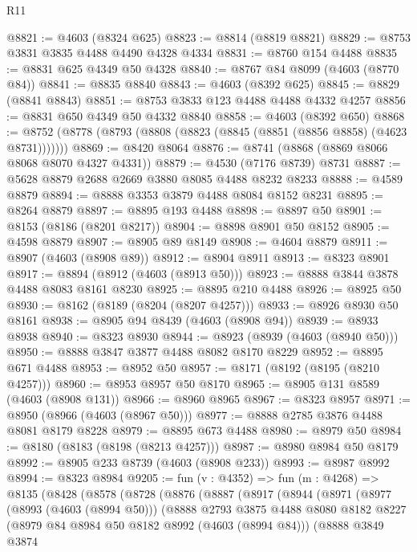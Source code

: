 \begin{lexlean}{R11}
\begin{coremodule}
@8821 := @4603 (@8324 @625)
@8823 := @8814 (@8819 @8821)
@8829 := @8753 @3831 @3835 @4488 @4490 @4328 @4334
@8831 := @8760 @154 @4488
@8835 := @8831 @625 @4349 @50 @4328
@8840 := @8767 @84 @8099 (@4603 (@8770 @84))
@8841 := @8835 @8840
@8843 := @4603 (@8392 @625)
@8845 := @8829 (@8841 @8843)
@8851 := @8753 @3833 @123 @4488 @4488 @4332 @4257
@8856 := @8831 @650 @4349 @50 @4332 @8840
@8858 := @4603 (@8392 @650)
@8868 := @8752 (@8778 (@8793 (@8808 (@8823 (@8845 (@8851 (@8856 @8858) (@4623 @8731)))))))
@8869 := @8420 @8064
@8876 := @8741 (@8868 (@8869 @8066 @8068 @8070 @4327 @4331))
@8879 := @4530 (@7176 @8739) @8731
@8887 := @5628 @8879 @2688 @2669 @3880 @8085 @4488 @8232 @8233
@8888 := @4589 @8879
@8894 := @8888 @3353 @3879 @4488 @8084 @8152 @8231
@8895 := @8264 @8879
@8897 := @8895 @193 @4488
@8898 := @8897 @50
@8901 := @8153 (@8186 (@8201 @8217))
@8904 := @8898 @8901 @50 @8152
@8905 := @4598 @8879
@8907 := @8905 @89 @8149
@8908 := @4604 @8879
@8911 := @8907 (@4603 (@8908 @89))
@8912 := @8904 @8911
@8913 := @8323 @8901
@8917 := @8894 (@8912 (@4603 (@8913 @50)))
@8923 := @8888 @3844 @3878 @4488 @8083 @8161 @8230
@8925 := @8895 @210 @4488
@8926 := @8925 @50
@8930 := @8162 (@8189 (@8204 (@8207 @4257)))
@8933 := @8926 @8930 @50 @8161
@8938 := @8905 @94 @8439 (@4603 (@8908 @94))
@8939 := @8933 @8938
@8940 := @8323 @8930
@8944 := @8923 (@8939 (@4603 (@8940 @50)))
@8950 := @8888 @3847 @3877 @4488 @8082 @8170 @8229
@8952 := @8895 @671 @4488
@8953 := @8952 @50
@8957 := @8171 (@8192 (@8195 (@8210 @4257)))
@8960 := @8953 @8957 @50 @8170
@8965 := @8905 @131 @8589 (@4603 (@8908 @131))
@8966 := @8960 @8965
@8967 := @8323 @8957
@8971 := @8950 (@8966 (@4603 (@8967 @50)))
@8977 := @8888 @2785 @3876 @4488 @8081 @8179 @8228
@8979 := @8895 @673 @4488
@8980 := @8979 @50
@8984 := @8180 (@8183 (@8198 (@8213 @4257)))
@8987 := @8980 @8984 @50 @8179
@8992 := @8905 @233 @8739 (@4603 (@8908 @233))
@8993 := @8987 @8992
@8994 := @8323 @8984
@9205 := fun (v : @4352) =>
  fun (m : @4268) =>
  @8135
    (@8428
      (@8578
        (@8728
          (@8876
            (@8887
              (@8917
                (@8944
                  (@8971
                    (@8977
                      (@8993 (@4603 (@8994 @50)))
                      (@8888
                        @2793
                        @3875
                        @4488
                        @8080
                        @8182
                        @8227
                        (@8979 @84 @8984 @50 @8182 @8992 (@4603 (@8994 @84)))
                        (@8888
                          @3849
                          @3874

\end{coremodule}
\end{lexlean}
